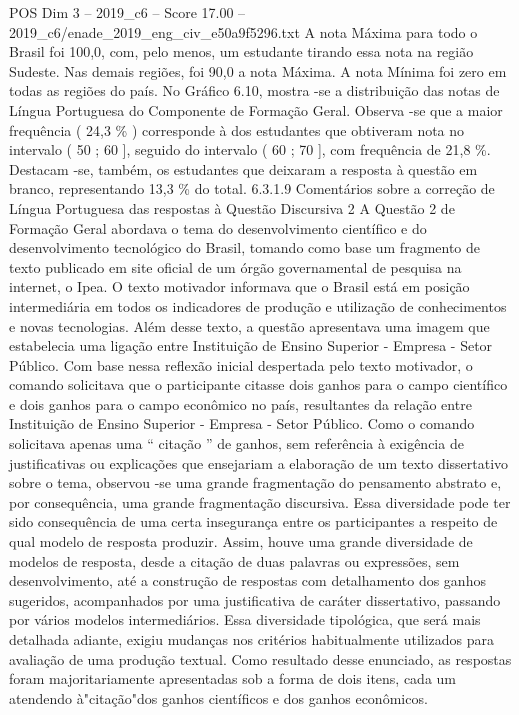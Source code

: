 \begin{textsample}{POS Dim 3 – 2019\_c6 – Score 17.00 – 2019\_c6/enade\_2019\_eng\_civ\_e50a9f5296.txt}
A nota Máxima para todo o Brasil foi 100,0, com, pelo menos, um estudante tirando essa nota na região Sudeste.
Nas demais regiões, foi 90,0 a nota Máxima.
A nota Mínima foi zero em todas as regiões do país.
No Gráfico 6.10, mostra -se a distribuição das notas de Língua Portuguesa do Componente de Formação Geral.
Observa -se que a maior frequência ( 24,3 \% ) corresponde à dos estudantes que obtiveram nota no intervalo ( 50 ; 60 ], seguido do intervalo ( 60 ; 70 ], com frequência de 21,8 \%.
Destacam -se, também, os estudantes que deixaram a resposta à questão em branco, representando 13,3 \% do total. 6.3.1.9 Comentários sobre a correção de Língua Portuguesa das respostas à Questão Discursiva 2 A Questão 2 de Formação Geral abordava o tema do desenvolvimento científico e do desenvolvimento tecnológico do Brasil, tomando como base um fragmento de texto publicado em site oficial de um órgão governamental de pesquisa na internet, o Ipea.
O texto motivador informava que o Brasil está em posição intermediária em todos os indicadores de produção e utilização de conhecimentos e novas tecnologias.
Além desse texto, a questão apresentava uma imagem que estabelecia uma ligação entre Instituição de Ensino Superior - Empresa - Setor Público.
Com base nessa reflexão inicial despertada pelo texto motivador, o comando solicitava que o participante citasse dois ganhos para o campo científico e dois ganhos para o campo econômico no país, resultantes da relação entre Instituição de Ensino Superior - Empresa - Setor Público.
Como o comando solicitava apenas uma “ citação ” de ganhos, sem referência à exigência de justificativas ou explicações que ensejariam a elaboração de um texto dissertativo sobre o tema, observou -se uma grande fragmentação do pensamento abstrato e, por consequência, uma grande fragmentação discursiva.
Essa diversidade pode ter sido consequência de uma certa insegurança entre os participantes a respeito de qual modelo de resposta produzir.
Assim, houve uma grande diversidade de modelos de resposta, desde a citação de duas palavras ou expressões, sem desenvolvimento, até a construção de respostas com detalhamento dos ganhos sugeridos, acompanhados por uma justificativa de caráter dissertativo, passando por vários modelos intermediários.
Essa diversidade tipológica, que será mais detalhada adiante, exigiu mudanças nos critérios habitualmente utilizados para avaliação de uma produção textual.
Como resultado desse enunciado, as respostas foram majoritariamente apresentadas sob a forma de dois itens, cada um atendendo à"citação"dos ganhos científicos e dos ganhos econômicos.

\end{textsample}

